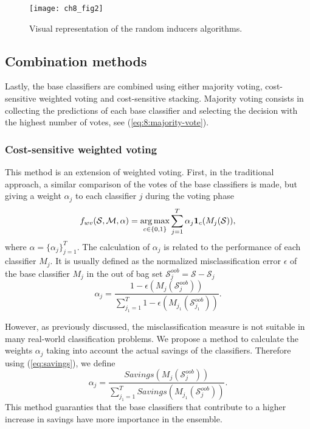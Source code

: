 {\begin{figure}[t!]
\texttt{[image: ch8\_fig2]}
\caption{Visual representation of the random inducers algorithms.}
\label{fig:8:2}
\end{figure} 


\subsection{Combination methods}

Lastly, the base classifiers are combined using either majority voting, cost-sensitive weighted 
voting and cost-sensitive stacking. Majority voting consists in collecting the predictions of 
each base classifier and selecting the decision with the highest number of votes, see 
(\ref{eq:8:majority-vote}).

\subsubsection{Cost-sensitive weighted voting}

This method is an extension of weighted voting. First, in the traditional approach, a 
similar comparison of the votes of the base classifiers is made, but giving a weight $\alpha_j$ 
to each classifier $j$ during the voting phase \citep{Zhou2012}
\begin{align} \label{eq:8:weighted-majority-vote}
  f_{wv}(\mathcal{S},\mathcal{M}, \alpha)
  =\operatorname*{arg\,max}_{c \in \{0,1\}} \sum_{j=1}^T \alpha_j \mathbf{1}_c(M_j(\mathcal{S})),
\end{align}
where $\alpha=\{\alpha_j\}_{j=1}^T$.
The calculation of $\alpha_j$ is related to the performance of each classifier $M_j$.
It is usually defined as the normalized misclassification error   $\epsilon$ of the base 
classifier $M_j$  in the out of bag set   $\mathcal{S}_j^{oob}=\mathcal{S}-\mathcal{S}_j$
\begin{equation}
  \alpha_j=\frac{1-\epsilon(M_j(\mathcal{S}_j^{oob}))}{\sum_{j_1=1}^T 
  1-\epsilon(M_{j_1}(\mathcal{S}_{j_1}^{oob}))}.
\end{equation}

However, as previously discussed, the misclassification measure is not suitable in  many 
real-world classification problems. We propose a method to calculate the weights $\alpha_j$  taking 
into account the actual savings of the classifiers. Therefore using (\ref{eq:savings}), we define
\begin{equation}
  \alpha_j=\frac{Savings(M_j(\mathcal{S}_j^{oob}))}
  {\sum_{j_1=1}^T Savings(M_{j_1}(\mathcal{S}_j^{oob}))}.
\end{equation}
This method guaranties that the base classifiers that contribute to a higher increase in savings 
have more importance in the ensemble.

}

